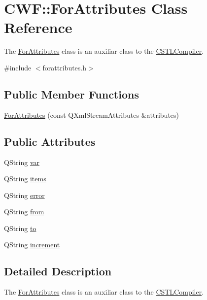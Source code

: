 \hypertarget{class_c_w_f_1_1_for_attributes}{\section{C\+W\+F\+:\+:For\+Attributes Class Reference}
\label{class_c_w_f_1_1_for_attributes}
}


The \hyperlink{class_c_w_f_1_1_for_attributes}{For\+Attributes} class is an auxiliar class to the \hyperlink{class_c_w_f_1_1_c_s_t_l_compiler}{C\+S\+T\+L\+Compiler}.  




{\ttfamily \#include $<$forattributes.\+h$>$}

\subsection*{Public Member Functions}
\begin{DoxyCompactItemize}
\item 
\hyperlink{class_c_w_f_1_1_for_attributes_a8b2245bb0b5b8b16de346ac8402678a0}{For\+Attributes} (const Q\+Xml\+Stream\+Attributes \&attributes)
\end{DoxyCompactItemize}
\subsection*{Public Attributes}
\begin{DoxyCompactItemize}
\item 
Q\+String \hyperlink{class_c_w_f_1_1_for_attributes_a531689e9e92369507be81971caf347a6}{var}
\item 
Q\+String \hyperlink{class_c_w_f_1_1_for_attributes_aa16fb4090c8e95ec98f8f9a1ff768dd3}{items}
\item 
Q\+String \hyperlink{class_c_w_f_1_1_for_attributes_ac27ba2f6562de074fb345d577f171ad6}{error}
\item 
Q\+String \hyperlink{class_c_w_f_1_1_for_attributes_acb6db58dc865974f20f1b9a291f7a94b}{from}
\item 
Q\+String \hyperlink{class_c_w_f_1_1_for_attributes_a33cef70ab52e64d4157ad75c8bfe604a}{to}
\item 
Q\+String \hyperlink{class_c_w_f_1_1_for_attributes_a316811830dab52e5f38eb8a5f43f1164}{increment}
\end{DoxyCompactItemize}


\subsection{Detailed Description}
The \hyperlink{class_c_w_f_1_1_for_attributes}{For\+Attributes} class is an auxiliar class to the \hyperlink{class_c_w_f_1_1_c_s_t_l_compiler}{C\+S\+T\+L\+Compiler}. 

